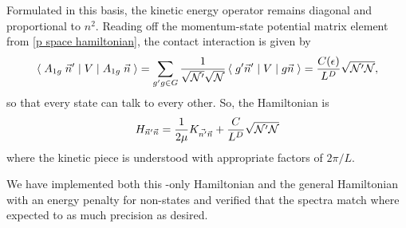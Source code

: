 Formulated in this basis, the kinetic energy operator remains diagonal and proportional to $n^2$.
Reading off the momentum-state potential matrix element from \eqref{p space hamiltonian}, the contact interaction is given by
\begin{equation}
    \left\langle\;A_{1g}\; \vec{n}'\;\middle|\;V\;\middle|\;A_{1g}\; \vec{n}\;\right\rangle
    =
    \sum_{g'g \in G}
        \frac{1}{\sqrt{\mathcal{N}'}\sqrt{\mathcal{N}}} \left\langle\;g'\vec{n}'\;\middle|\;V\;\middle|\;g\vec{n}\;\right\rangle
    =
    \frac{C(\epsilon)}{L^D} \sqrt{\mathcal{N}'\mathcal{N}},
\end{equation}
so that every \Aoneg state can talk to every other.
So, the Hamiltonian is
\begin{equation}
    H_{\vec{n}'\vec{n}} = \frac{1}{2\mu} K_{\vec{n'}\vec{n}} + \frac{C}{L^D} \sqrt{\mathcal{N}'\mathcal{N}}
\end{equation}
where the kinetic piece is understood with appropriate factors of $2\pi/L$.

We have implemented both this \Aoneg-only Hamiltonian and the general Hamiltonian with an energy penalty for non-\Aoneg states and verified that the spectra match where expected to as much precision as desired.

